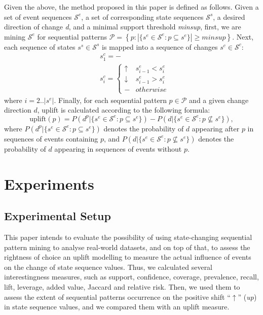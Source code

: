 \documentclass[runningheads,a4paper]{llncs}
\begin{document}
Given the above, the method proposed in this paper is defined as follows.
Given a set of event sequences $\mathcal{S}^e$, a set of corresponding state sequences $\mathcal{S}^s$, a desired direction of change \textit{d}, and a minimal support threshold \textit{minsup}, first, we are mining $\mathcal{S}^e$ for sequential patterns $\mathcal{P}=\left\{p:|\{s^e\in\mathcal{S}^e:p\subseteq s^e\}|\geq\textit{minsup}\right\}$.
Next, each sequence of states $s^s\in\mathcal{S}^s$ is mapped into a sequence of changes $s^c\in\mathcal{S}^c$:
\begin{equation*}
\begin{split}
&s^c_1=-\\
&s^c_i=\begin{cases}
	\uparrow & s^e_{i-1}<s^e_i \\
	\downarrow & s^e_{i-1}>s^e_i \\
	- & otherwise
\end{cases}
\end{split}
\end{equation*}
where $i=2..|s^e|$.
Finally, for each sequential pattern $p\in\mathcal{P}$ and a given change direction $d$, uplift is calculated according to the following formula:
\begin{equation*}
\text{uplift}(p)=P(d^p|\{s^e\in\mathcal{S}^e:p\subseteq s^e\})-P(d|\{s^e\in\mathcal{S}^e:p\not\subseteq s^e\}),
\end{equation*}
where $P(d^p|\{s^e\in\mathcal{S}^e:p\subseteq s^e\})$ denotes the probability of $d$ appearing after $p$ in sequences of events containing $p$, and $P(d|\{s^e\in\mathcal{S}^e:p\not\subseteq s^e\})$ denotes the probability of $d$ appearing in sequences of events without $p$.

\section{Experiments}
\label{sec:experiments}
\subsection{Experimental Setup}
This paper intends to evaluate the possibility of using state-changing sequential pattern mining to analyse real-world datasets, and on top of that, to assess the rightness of choice an uplift modelling to measure the actual influence of events on the change of state sequence values. Thus, we calculated several interestingness measures, such as support, confidence, coverage, prevalence, recall, lift, leverage, added value, Jaccard and relative risk. Then, we used them to assess the extent of sequential patterns occurrence on the positive shift ``$\uparrow$'' (\textit{up}) in state sequence values, and we compared them with an uplift measure.
\end{document}

